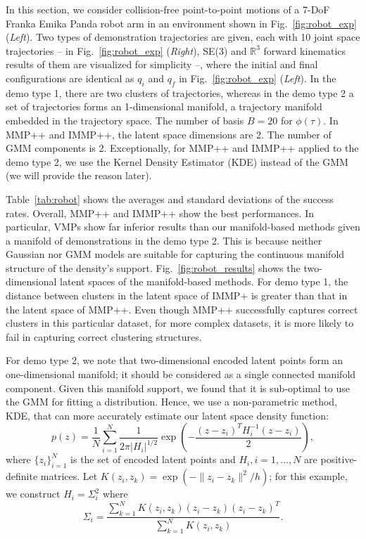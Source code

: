 In this section, we consider collision-free point-to-point motions of a 7-DoF Franka Emika Panda robot arm in 
an environment shown in Fig.~\ref{fig:robot_exp} ({\it Left}). Two types of demonstration trajectories are given, each with 10 joint space trajectories -- in Fig.~\ref{fig:robot_exp} ({\it Right}), SE(3) and $\mathbb{R}^{3}$ forward kinematics results of them are visualized for simplicity --, where the initial and final configurations are identical as $q_i$ and $q_f$ in Fig.~\ref{fig:robot_exp} ({\it Left}). 
In the demo type 1, there are two clusters of trajectories, whereas in the demo type 2 a set of trajectories forms an 1-dimensional manifold, a trajectory manifold embedded in the trajectory space. The number of basis $B=20$ for $\phi(\tau)$. In MMP++ and IMMP++, the latent space dimensions are 2. The number of GMM components is 2. Exceptionally, for MMP++ and IMMP++ applied to the demo type 2, we use the Kernel Density Estimator (KDE) instead of the GMM (we will provide the reason later).

Table~\ref{tab:robot} shows the averages and standard deviations of the success rates. Overall, MMP++ and IMMP++ show the best performances.
In particular, VMPs show far inferior results than our manifold-based methods given a manifold of demonstrations in the demo type 2. This is because neither Gaussian nor GMM models are suitable for capturing the continuous manifold structure of the density's support.
Fig.~\ref{fig:robot_results} shows the two-dimensional latent spaces of the manifold-based methods. 
For demo type 1, the distance between clusters in the latent space of IMMP+ is greater than that in the latent space of MMP++. 
Even though MMP++ successfully captures correct clusters in this particular dataset, for more complex datasets, it is more likely to fail in capturing correct clustering structures.

For demo type 2, we note that two-dimensional encoded latent points form an one-dimensional manifold; 
it should be considered as a single connected manifold component. 
Given this manifold support, we found that it is sub-optimal to use the GMM for fitting a distribution. 
Hence, we use a non-parametric method, KDE, that can more accurately estimate our latent space density function:
\begin{equation}
\label{eq:KDE_density}
    p(z) = \frac{1}{N}\sum_{i=1}^{N}\frac{1}{2\pi|H_i|^{1/2}} \exp(- \frac{(z-z_i)^T H_i^{-1} (z-z_i)}{2}),
\end{equation}
where $\{z_i\}_{i=1}^{N}$ is the set of encoded latent points and $H_i,i=1,\ldots,N$ are positive-definite matrices. 
Let $K(z_i, z_k) = \exp(-\|z_i-z_k\|^2/h)$; for this example, we construct $H_i=\Sigma_i^2$ where
\begin{equation}
    \Sigma_i = \frac{\sum_{k=1}^{N} K(z_i, z_k) (z_i - z_k) (z_i - z_k)^T}{\sum_{k=1}^{N} K(z_i, z_k)}.
\end{equation}

